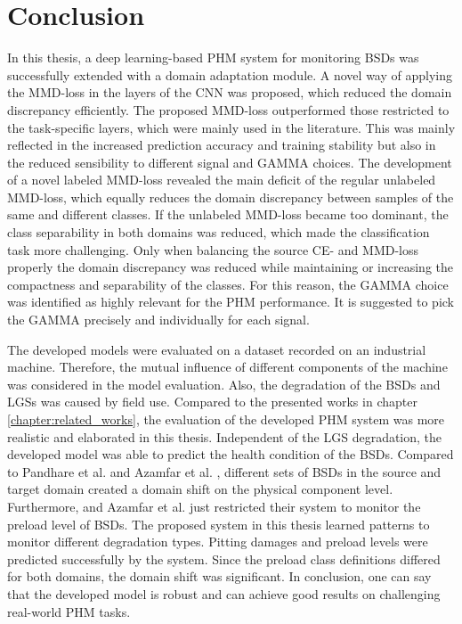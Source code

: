 \chapter{Conclusion}\label{chapter:conclusion}

In this thesis, a deep learning-based PHM system for monitoring BSDs was successfully extended with a domain adaptation module. A novel way of applying the MMD-loss in the layers of the CNN was proposed, which reduced the domain discrepancy efficiently. The proposed MMD-loss outperformed those restricted to the task-specific layers, which were mainly used in the literature. This was mainly reflected in the increased prediction accuracy and training stability but also in the reduced sensibility to different signal and GAMMA choices. The development of a novel labeled MMD-loss revealed the main deficit of the regular unlabeled MMD-loss, which equally reduces the domain discrepancy between samples of the same and different classes. If the unlabeled MMD-loss became too dominant, the class separability in both domains was reduced, which made the classification task more challenging. Only when balancing the source CE- and MMD-loss properly the domain discrepancy was reduced while maintaining or increasing the compactness and separability of the classes. For this reason, the GAMMA choice was identified as highly relevant for the PHM performance. It is suggested to pick the GAMMA precisely and individually for each signal.

The developed models were evaluated on a dataset recorded on an industrial machine. Therefore, the mutual influence of different components of the machine was considered in the model evaluation. Also, the degradation of the BSDs and LGSs was caused by field use. Compared to the presented works in chapter \ref{chapter:related_works}, the evaluation of the developed PHM system was more realistic and elaborated in this thesis. Independent of the LGS degradation, the developed model was able to predict the health condition of the BSDs. Compared to Pandhare et al. \cite{Pandhare2021} and Azamfar et al. \cite{AZAMFAR2020103932}, different sets of BSDs in the source and target domain created a domain shift on the physical component level. Furthermore, \cite{Pandhare2021} and Azamfar et al. \cite{AZAMFAR2020103932} just restricted their system to monitor the preload level of BSDs. The proposed system in this thesis learned patterns to monitor different degradation types. Pitting damages and preload levels were predicted successfully by the system. Since the preload class definitions differed for both domains, the domain shift was significant. In conclusion, one can say that the developed model is robust and can achieve good results on challenging real-world PHM tasks.